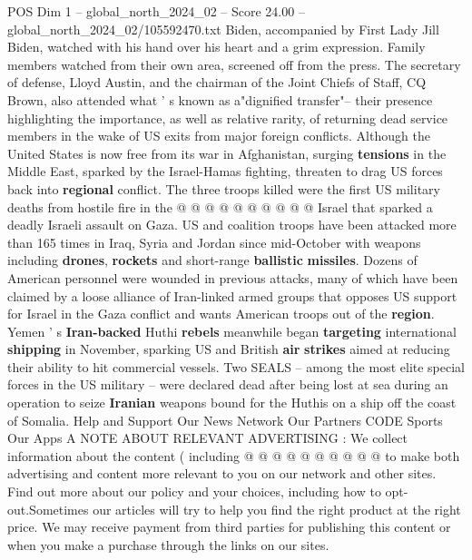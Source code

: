 \begin{textsample}{POS Dim 1 – global\_north\_2024\_02 – Score 24.00 – global\_north\_2024\_02/105592470.txt}
Biden, accompanied by First Lady Jill Biden, watched with his hand over his heart and a grim expression.
Family members watched from their own area, screened off from the press.
The secretary of defense, Lloyd Austin, and the chairman of the Joint Chiefs of Staff, CQ Brown, also attended what ' s known as a"dignified transfer"-- their presence highlighting the importance, as well as relative rarity, of returning dead service members in the wake of US exits from major foreign conflicts.
Although the United States is now free from its war in Afghanistan, surging \textbf{tensions} in the Middle East, sparked by the Israel-Hamas fighting, threaten to drag US forces back into \textbf{regional} conflict.
The three troops killed were the first US military deaths from hostile fire in the @ @ @ @ @ @ @ @ @ @ Israel that sparked a deadly Israeli assault on Gaza.
US and coalition troops have been attacked more than 165 times in Iraq, Syria and Jordan since mid-October with weapons including \textbf{drones}, \textbf{rockets} and short-range \textbf{ballistic} \textbf{missiles}.
Dozens of American personnel were wounded in previous attacks, many of which have been claimed by a loose alliance of Iran-linked armed groups that opposes US support for Israel in the Gaza conflict and wants American troops out of the \textbf{region}.
Yemen ' s \textbf{Iran-backed} Huthi \textbf{rebels} meanwhile began \textbf{targeting} international \textbf{shipping} in November, sparking US and British \textbf{air} \textbf{strikes} aimed at reducing their ability to hit commercial vessels.
Two SEALS -- among the most elite special forces in the US military -- were declared dead after being lost at sea during an operation to seize \textbf{Iranian} weapons bound for the Huthis on a ship off the coast of Somalia.
Help and Support Our News Network Our Partners CODE Sports Our Apps A NOTE ABOUT RELEVANT ADVERTISING : We collect information about the content ( including @ @ @ @ @ @ @ @ @ @ to make both advertising and content more relevant to you on our network and other sites.
Find out more about our policy and your choices, including how to opt-out.Sometimes our articles will try to help you find the right product at the right price.
We may receive payment from third parties for publishing this content or when you make a purchase through the links on our sites.

\end{textsample}
